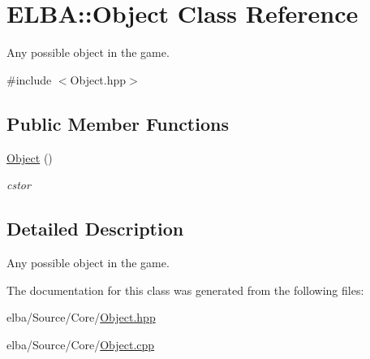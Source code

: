 \hypertarget{class_e_l_b_a_1_1_object}{}\section{E\+L\+BA\+:\+:Object Class Reference}
\label{class_e_l_b_a_1_1_object}


Any possible object in the game.  




{\ttfamily \#include $<$Object.\+hpp$>$}

\subsection*{Public Member Functions}
\begin{DoxyCompactItemize}
\item 
\mbox{\label{class_e_l_b_a_1_1_object_aa3abbb9687693d254ada1d0b6573c40e}} 
\mbox{\hyperlink{class_e_l_b_a_1_1_object_aa3abbb9687693d254ada1d0b6573c40e}{Object}} ()
\begin{DoxyCompactList}\small\item\em cstor \end{DoxyCompactList}\end{DoxyCompactItemize}


\subsection{Detailed Description}
Any possible object in the game. 

The documentation for this class was generated from the following files\+:\begin{DoxyCompactItemize}
\item 
elba/\+Source/\+Core/\mbox{\hyperlink{_object_8hpp}{Object.\+hpp}}\item 
elba/\+Source/\+Core/\mbox{\hyperlink{_object_8cpp}{Object.\+cpp}}\end{DoxyCompactItemize}
